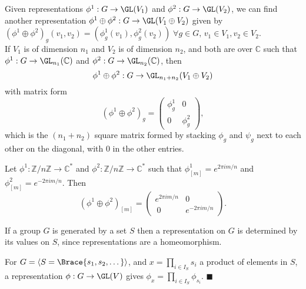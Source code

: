 \documentclass[../Project.tex]{subfiles}
\begin{document}
\begin{defi}
\label{directsumofrep}
	Given representations $\phi^1 : G \to \GL(V_1)$ and $\phi^2 : G \to \GL(V_2)$, we can find another representation $\phi^1 \oplus \phi^2 : G \to \GL(V_1 \oplus V_2)$ given by $(\phi^1 \oplus \phi^2)_g(v_1,v_2) = (\phi^1_g(v_1),\phi^2_g(v_2))\;\forall g\in G,\,v_1 \in V_1, v_2 \in V_2$.\\

	If $V_1$ is of dimension $n_1$ and $V_2$ is of dimension $n_2$, and both are over $\mathbb{C}$ such that $\phi^1 : G \to \GL_{n_1}(\mathbb{C})$ and $\phi^2 : G \to \GL_{n_2}(\mathbb{C})$, then
	$$\phi^1 \oplus \phi^2 : G \to \GL_{n_1 + n_2}(V_1 \oplus V_2)$$
	with matrix form
	$$ (\phi^1 \oplus \phi^2)_g =
	\begin{pmatrix}
		\phi^1_g & 0\\ 0 & \phi^2_g	
	\end{pmatrix},$$
	which is the $(n_1 + n_2)$ square matrix formed by stacking $\phi_g$ and $\psi_g$ next to each other on the diagonal, with $0$ in the other entries.
\end{defi}

\begin{exam}[ \cite{1}]
	Let $\phi^1 : \mathbb{Z}/n\mathbb{Z} \to \mathbb{C}^*$ and $\phi^2 : \mathbb{Z}/n\mathbb{Z} \to \mathbb{C}^*$ such that $\phi^1_{[m]} = e^{2\pi i m/n}$ and $\phi^2_{[m]} = e^{-2\pi i m/n}$. Then
	$$(\phi^1 \oplus \phi^2)_{[m]} = \begin{pmatrix}e^{2\pi i m/n} & 0 \\\ 0 & e^{-2 \pi i m/n}\end{pmatrix}.$$
\end{exam}

\begin{lemm}[\cite{1}]
	If a group $G$ is generated by a set $S$ then a representation on $G$ is determined by its values on $S$, since representations are a homeomorphism.
\end{lemm}
\begin{proo*}
	For $G = \langle S = \Brace{s_1,s_2,\dots} \rangle$, and $x = \prod\limits_{i \in I_S} s_i$ a product of elements in $S$, a representation $\phi : G \to \GL(V)$ gives
	$\phi_x = \prod\limits_{i \in I_S} \phi_{s_i}$. $\blacksquare$
\end{proo*}
\end{document}
